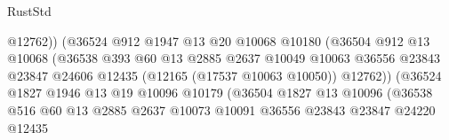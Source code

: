 \begin{lexlean}{RustStd}
\begin{coremodule}
                                            @12762))
                                        (@36524
                                          @912
                                          @1947
                                          @13
                                          @20
                                          @10068
                                          @10180
                                          (@36504
                                            @912
                                            @13
                                            @10068
                                            (@36538
                                              @393
                                              @60
                                              @13
                                              @2885
                                              @2637
                                              @10049
                                              @10063
                                              @36556
                                              @23843
                                              @23847
                                              @24606
                                              @12435
                                              (@12165 (@17537 @10063 @10050))
                                              @12762))
                                          (@36524
                                            @1827
                                            @1946
                                            @13
                                            @19
                                            @10096
                                            @10179
                                            (@36504
                                              @1827
                                              @13
                                              @10096
                                              (@36538
                                                @516
                                                @60
                                                @13
                                                @2885
                                                @2637
                                                @10073
                                                @10091
                                                @36556
                                                @23843
                                                @23847
                                                @24220
                                                @12435

\end{coremodule}
\end{lexlean}

